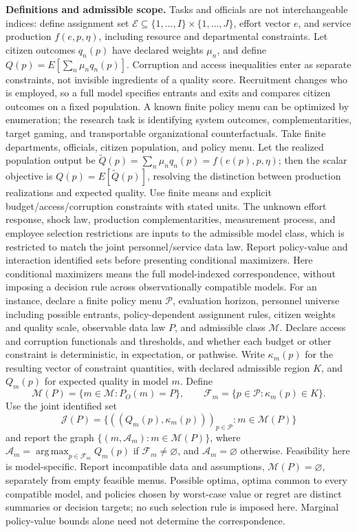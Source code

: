 \documentclass[11pt,a4paper]{article}
\DeclareMathOperator*{\argmax}{arg\,max}
\begin{document}
\textbf{Definitions and admissible scope.} Tasks and officials are not interchangeable indices: define assignment set \(\mathcal E\subseteq\{1,\ldots,I\}\times\{1,\ldots,J\}\), effort vector \(e\), and service production \(f(e,p,\eta)\), including resource and departmental constraints. Let citizen outcomes \(q_n(p)\) have declared weights \(\mu_n\), and define \(Q(p)=E[\sum_n\mu_nq_n(p)]\). Corruption and access inequalities enter as separate constraints, not invisible ingredients of a quality score. Recruitment changes who is employed, so a full model specifies entrants and exits and compares citizen outcomes on a fixed population. A known finite policy menu can be optimized by enumeration; the research task is identifying system outcomes, complementarities, target gaming, and transportable organizational counterfactuals. Take finite departments, officials, citizen population, and policy menu. Let the realized population output be \(\widetilde Q(p)=\sum_n\mu_nq_n(p)=f(e(p),p,\eta)\); then the scalar objective is \(Q(p)=E[\widetilde Q(p)]\), resolving the distinction between production realizations and expected quality. Use finite means and explicit budget/access/corruption constraints with stated units. The unknown effort response, shock law, production complementarities, measurement process, and employee selection restrictions are inputs to the admissible model class, which is restricted to match the joint personnel/service data law. Report policy-value and interaction identified sets before presenting conditional maximizers. Here conditional maximizers means the full model-indexed correspondence, without imposing a decision rule across observationally compatible models. For an instance, declare a finite policy menu \(\mathcal P\), evaluation horizon, personnel universe including possible entrants, policy-dependent assignment rules, citizen weights and quality scale, observable data law \(P\), and admissible class \(\mathcal M\). Declare access and corruption functionals and thresholds, and whether each budget or other constraint is deterministic, in expectation, or pathwise. Write \(\kappa_m(p)\) for the resulting vector of constraint quantities, with declared admissible region \(K\), and \(Q_m(p)\) for expected quality in model \(m\). Define
\[
\mathcal M(P)=\{m\in\mathcal M:P_O(m)=P\},\qquad
\mathcal F_m=\{p\in\mathcal P:\kappa_m(p)\in K\}.
\]
Use the joint identified set
\[
\mathcal J(P)=\{((Q_m(p),\kappa_m(p)))_{p\in\mathcal P}:m\in\mathcal M(P)\}
\]
and report the graph \(\{(m,\mathcal A_m):m\in\mathcal M(P)\}\), where \(\mathcal A_m=\argmax_{p\in\mathcal F_m}Q_m(p)\) if \(\mathcal F_m\ne\varnothing\), and \(\mathcal A_m=\varnothing\) otherwise. Feasibility here is model-specific. Report incompatible data and assumptions, \(\mathcal M(P)=\varnothing\), separately from empty feasible menus. Possible optima, optima common to every compatible model, and policies chosen by worst-case value or regret are distinct summaries or decision targets; no such selection rule is imposed here. Marginal policy-value bounds alone need not determine the correspondence.
\end{document}

